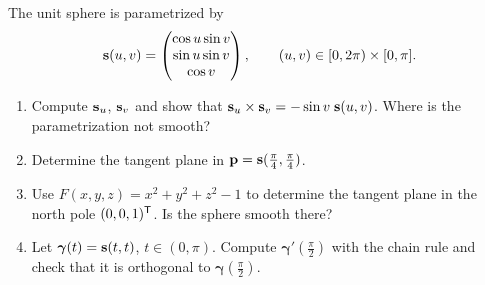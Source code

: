 The unit sphere is parametrized by
\[
\mathbf{s}(u,v)=\begin{pmatrix}\cos u\sin v\\\sin u\sin v\\\cos v\end{pmatrix},\qquad (u,v)\in[0,2\pi)\times[0,\pi].
\]
\begin{enumerate}
\item Compute $\mathbf{s}_u$, $\mathbf{s}_v$ and show that $\mathbf{s}_u\times\mathbf{s}_v=-\sin v\;\mathbf{s}(u,v)$. Where is the parametrization not smooth?
\item Determine the tangent plane in $\mathbf{p}=\mathbf{s}(\frac\pi4,\frac\pi4)$.
\item Use $F(x,y,z)=x^2+y^2+z^2-1$ to determine the tangent plane in the north pole $(0,0,1)^{\mathsf{T}}$. Is the sphere smooth there?
\item Let $\boldsymbol\gamma(t)=\mathbf{s}(t,t)$, $t\in(0,\pi)$. Compute $\boldsymbol\gamma'(\frac\pi2)$ with the chain rule and check that it is orthogonal to $\boldsymbol\gamma(\frac\pi2)$.
\end{enumerate}


